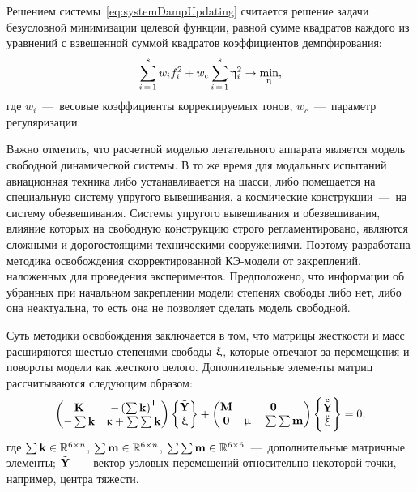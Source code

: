 Решением системы~\eqref{eq:systemDampUpdating} считается решение задачи безусловной минимизации целевой функции, равной сумме квадратов каждого из уравнений с взвешенной суммой квадратов коэффициентов демпфирования:
\begin{equation}
	\sum \limits_{i\,=\,1} ^ s w_i f_i ^ 2 + w_c \sum \limits_{i\,=\,1}^s \upeta_i ^ 2 \rightarrow \min_{\mathbf{\upeta}},
	\label{eq:objFinalDampFunUpdating}
\end{equation}
где $ w_i $~---~весовые коэффициенты корректируемых тонов, $ w_c $~---~параметр регуляризации.

Важно отметить, что расчетной моделью летательного аппарата является модель свободной динамической системы. В то же время для модальных испытаний авиационная техника либо устанавливается на шасси, либо помещается на специальную систему упругого вывешивания, а космические конструкции~---~на систему обезвешивания. Системы упругого вывешивания и обезвешивания, влияние которых на свободную конструкцию строго регламентировано, являются сложными и дорогостоящими техническими сооружениями. Поэтому разработана методика освобождения скорректированной КЭ-модели от закреплений, наложенных для проведения экспериментов. Предположено, что информации об убранных при начальном закреплении модели степенях свободы либо нет, либо она неактуальна, то есть она не позволяет сделать модель свободной.

Суть методики освобождения заключается в том, что матрицы жесткости и масс расширяются шестью степенями свободы $ \mathbf{\upxi} $, которые отвечают за перемещения и повороты модели как жесткого целого. Дополнительные элементы матриц рассчитываются следующим образом:
\begin{equation}
	\begin{pmatrix}
		\mathbf{K} & -\left( \sum \mathbf{k} \right) ^ \mathsf{T} \\
		 -\sum \mathbf{k} & \upkappa + \sum \sum \mathbf{k}
	\end{pmatrix}
	\begin{Bmatrix}
		\tilde{\mathbf{Y}} \\
		\upxi
	\end{Bmatrix}
	+
	\begin{pmatrix}
		\mathbf{M} & \mathbf{0} \\
		\mathbf{0} & \upmu - \sum \sum \mathbf{m}
	\end{pmatrix}
		\begin{Bmatrix}
		\ddot{\tilde{\mathbf{Y}}} \\
		\ddot{\upxi}
	\end{Bmatrix}
	= 0,
\end{equation}
где $ \sum \mathbf{k} \in \mathbb{R}^{6 \times n}$, $ \sum \mathbf{m} \in \mathbb{R}^{6 \times n}$, $ \sum \sum \mathbf{m} \in \mathbb{R}^{6 \times 6} $~---~дополнительные матричные элементы; $ \tilde{\mathbf{Y}} $~---~вектор узловых перемещений относительно некоторой точки, например, центра тяжести.

